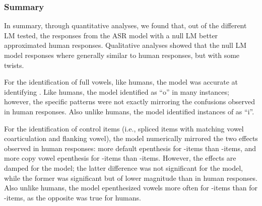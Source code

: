 {%

\subsubsection{Summary}
In summary, through quantitative analyses, we found that, out of the different LM tested, the responses from the ASR model with a null LM better approximated human responses. Qualitative analyses showed that the null LM model responses where generally similar to human responses, but with some twists.

For the identification of full vowels, like humans, the model was accurate at identifying . Like humans, the model identified  as ``o'' in many instances; however, the specific patterns were not exactly mirroring the confusions observed in human responses. Also unlike humans, the model identified instances of  as ``i''.

For the identification of control items (i.e., spliced items with matching vowel coarticulation and flanking vowel), the model numerically mirrored the two effects observed in human responses: more default  epenthesis for -items than -items, and more copy vowel epenthesis for -items than -items. However, the effects are damped for the model; the latter difference was not significant for the model, while the former was significant but of lower magnitude than in human responses. Also unlike humans, the model epenthesized vowels more often for -items than for -items, as the opposite was true for humans. 

}
